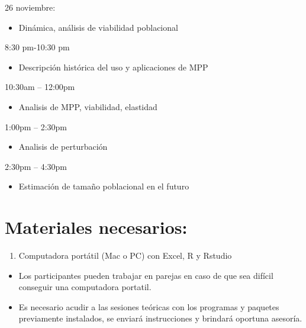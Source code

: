 \documentclass[
]{book}
\providecommand{\tightlist}{%
  \setlength{\itemsep}{0pt}\setlength{\parskip}{0pt}}
\theoremstyle{definition}
\theoremstyle{definition}
\theoremstyle{definition}
\theoremstyle{definition}
\theoremstyle{remark}
\begin{document}
26 noviembre:

\begin{itemize}
\tightlist
\item
  Dinámica, análisis de viabilidad poblacional
\end{itemize}

8:30 pm-10:30 pm

\begin{itemize}
\tightlist
\item
  Descripción histórica del uso y aplicaciones de MPP
\end{itemize}

10:30am -- 12:00pm

\begin{itemize}
\tightlist
\item
  Analisis de MPP, viabilidad, elastidad
\end{itemize}

1:00pm -- 2:30pm

\begin{itemize}
\tightlist
\item
  Analisis de perturbación
\end{itemize}

2:30pm -- 4:30pm

\begin{itemize}
\tightlist
\item
  Estimación de tamaño poblacional en el futuro
\end{itemize}

\hypertarget{materiales-necesarios}{%
\section{Materiales necesarios:}\label{materiales-necesarios}}

\begin{enumerate}
\def\labelenumi{\arabic{enumi}.}
\tightlist
\item
  Computadora portátil (Mac o PC) con Excel, R y Rstudio
\end{enumerate}

\begin{itemize}
\tightlist
\item
  Los participantes pueden trabajar en parejas en caso de que sea
  difícil conseguir una computadora portatil.\\
\item
  Es necesario acudir a las sesiones teóricas con los programas y
  paquetes previamente instalados, se enviará instrucciones y brindará
  oportuna asesoría.
\end{itemize}
\end{document}
